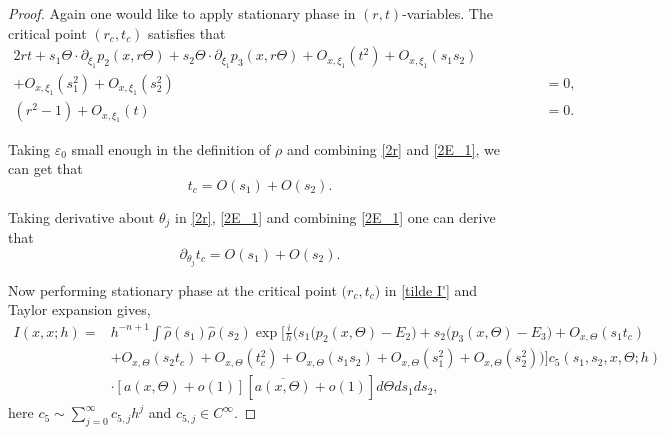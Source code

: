 \documentclass[10pt,a4paper]{amsart}
\renewcommand{\epsilon}{\varepsilon}
\begin{document}
\begin{proof}
Again one would like to apply stationary phase in $(r, t)$-variables. The critical point $(r_c,t_c)$ satisfies that
\begin{align}
2r t  +s_1\Theta\cdot \partial_{\xi_1} p_2(x, r\Theta)+s_2\Theta\cdot \partial_{\xi_1} p_3(x, r\Theta)+O_{x,\xi_1}(t^2)+O_{x,\xi_1}(s_1 s_2)\qquad\qquad & \nonumber \\
+ O_{x,\xi_1}(s_1^2)+O_{x,\xi_1}(s_2^2)&=0, \label{2r}\\
(r^2-1)+O_{x,\xi_1}(t)&=0. \label{2E_1}
\end{align}

Taking $\epsilon_0$ small enough in the definition of $\rho$ and combining \eqref{2r} and \eqref{2E_1}, we can get that
\begin{equation}\label{t_c 2}
t_c=O(s_1)+O(s_2).
\end{equation}


Taking derivative about $\theta_j$ in \eqref{2r}, \eqref{2E_1} and combining \eqref{2E_1} one can derive that
\begin{equation}\label{d t_c 2}
\partial_{\theta_j} t_c =O(s_1)+O(s_2).
\end{equation}

Now performing stationary phase at the critical point $\big(r_c, t_c \big)$ in \eqref{tilde I'} and Taylor expansion gives,
\begin{align}
I (x, x; h)=&h^{-n+1}\int \hat{\rho}(s_1)\hat{\rho}(s_2)  \exp\Big[\frac{i}h \Big(s_1\big(p_2(x, \Theta)-E_2\big)+s_2\big(p_3(x, \Theta)-E_3\big)+O_{x,\Theta}(s_1t_c) \nonumber\\ 
& +O_{x,\Theta}(s_2t_c)+O_{x,\Theta}(t_c^2)+O_{x,\Theta}(s_1 s_2)+O_{x,\Theta}(s_1^2)+O_{x,\Theta}(s_2^2)\Big) \Big] c_5(s_1, s_2, x, \Theta; h)\nonumber\\
&\cdot [a(x, \Theta)+o(1)] [\overline{a(x, \Theta)}+o(1)] d\Theta ds_1 ds_2,
\end{align}
here $c_5\sim \sum_{j=0}^\infty c_{5,j} h^j$ and $c_{5,j}\in C^\infty$.


\end{proof}
\end{document}
